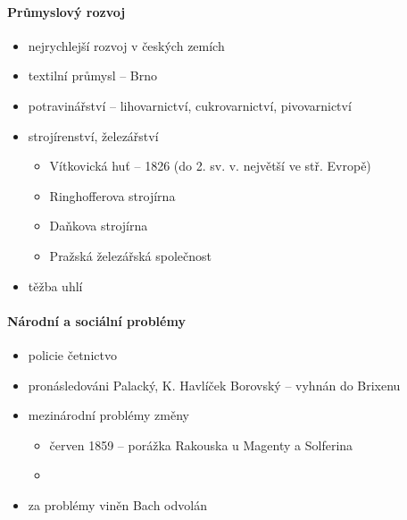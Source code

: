 \paragraph{Průmyslový rozvoj}
\begin{itemize}
\item nejrychlejší rozvoj v českých zemích
\item textilní průmysl -- Brno
\item potravinářství -- lihovarnictví, cukrovarnictví, pivovarnictví
\item strojírenství, železářství
	\begin{itemize}
	\item Vítkovická huť -- 1826 (do 2. sv. v. největší ve stř. Evropě)
	\item Ringhofferova strojírna 
	\item Daňkova strojírna 
	\item Pražská železářská společnost
	\end{itemize}
\item těžba uhlí
\end{itemize}

\paragraph{Národní a sociální problémy}
\begin{itemize}
\item policie četnictvo
\item pronásledováni Palacký, K. Havlíček Borovský -- vyhnán do Brixenu
\item mezinárodní problémy \ra změny
	\begin{itemize}
	\item červen 1859 -- porážka Rakouska u Magenty a Solferina
	\item {}
	\end{itemize}
\item za problémy viněn Bach \ra odvolán
\end{itemize}

